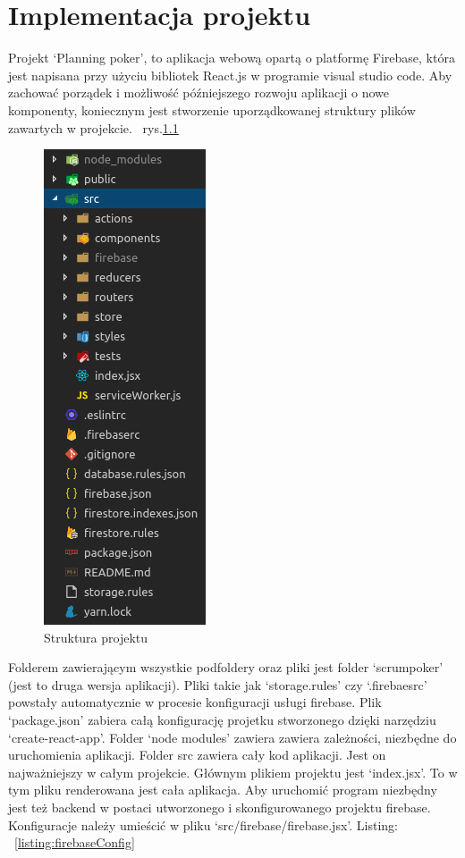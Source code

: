 \chapter{Implementacja projektu}

Projekt `Planning poker', to aplikacja webową opartą o platformę Firebase,
która jest napisana przy użyciu bibliotek React.js w programie visual studio code.
Aby zachować porządek i możliwość późniejszego rozwoju aplikacji o nowe komponenty,
koniecznym jest stworzenie uporządkowanej struktury plików zawartych w projekcie.
~rys.\ref{rys:projekt}
\begin{figure}
	\centering\includegraphics[width=.3\textwidth]{img/projekt}
	\caption{Struktura projektu}\label{rys:projekt}%
\end{figure}
Folderem zawierającym wszystkie podfoldery oraz pliki jest folder `scrumpoker' (jest to druga wersja aplikacji).
Pliki takie jak `storage.rules' czy `.firebaesrc' powstały automatycznie w procesie konfiguracji usługi firebase.
Plik `package.json' zabiera całą konfigurację projetku stworzonego dzięki narzędziu `create-react-app'.
Folder `node modules' zawiera zawiera zależności, niezbędne do uruchomienia aplikacji.
    Folder src zawiera cały kod aplikacji. Jest on najważniejszy w całym projekcie.
Głównym plikiem projektu jest `index.jsx'. To w tym pliku renderowana jest cała aplikacja.
Aby uruchomić program niezbędny jest też backend w postaci utworzonego i skonfigurowanego projektu firebase.
Konfiguracje należy umieścić w pliku `src/firebase/firebase.jsx'. Listing:
~\ref{listing:firebaseConfig} 

